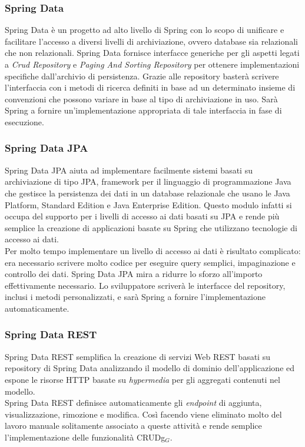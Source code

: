 \subsubsection{Spring Data}
Spring Data è un progetto ad alto livello di Spring con lo scopo di unificare e facilitare l'accesso a diversi livelli di archiviazione, ovvero database sia relazionali che non relazionali. Spring Data fornisce interfacce generiche per gli aspetti legati a \textit{Crud Repository} e \textit{Paging And Sorting Repository} per ottenere implementazioni specifiche dall'archivio di persistenza. Grazie alle repository basterà scrivere l'interfaccia con i metodi di ricerca definiti in base ad un determinato insieme di convenzioni che possono variare in base al tipo di archiviazione in uso. Sarà Spring  a fornire un'implementazione appropriata di tale interfaccia in fase di esecuzione.

\subsubsection{Spring Data JPA}
Spring Data JPA aiuta ad implementare facilmente sistemi basati su archiviazione di tipo JPA, framework per il linguaggio di programmazione Java che gestisce la persistenza dei dati in un database relazionale che usano le Java Platform, Standard Edition e Java Enterprise Edition. Questo modulo infatti si occupa del supporto per i livelli di accesso ai dati basati su JPA e rende più semplice la creazione di applicazioni basate su Spring che utilizzano tecnologie di accesso ai dati.\\
Per molto tempo implementare un livello di accesso ai dati è risultato complicato: era necessario scrivere molto codice per eseguire query semplici, impaginazione e controllo dei dati. Spring Data JPA mira a ridurre lo sforzo all'importo effettivamente necessario. Lo sviluppatore scriverà le interfacce del repository, inclusi i metodi personalizzati, e sarà Spring a fornire l'implementazione automaticamente.

\subsubsection{Spring Data REST}
Spring Data REST semplifica la creazione di servizi Web REST basati su repository di Spring Data analizzando il modello di dominio dell'applicazione ed espone le risorse HTTP basate su \textit{hypermedia} per gli aggregati contenuti nel modello.\\
Spring Data REST definisce automaticamente gli \textit{endpoint} di aggiunta, visualizzazione, rimozione e modifica. Così facendo viene eliminato molto del lavoro manuale solitamente associato a queste attività e rende semplice l'implementazione delle funzionalità \gls{CRUDg}$_G$.  

